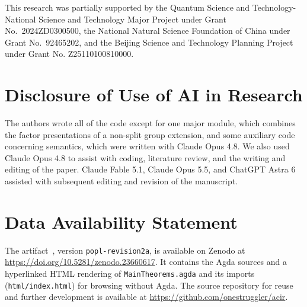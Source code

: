 \documentclass[acmsmall,review]{acmart}
\begin{document}
\begin{acks}
This research was partially supported by the Quantum Science
and Technology-National Science and Technology Major Project under Grant
No.~2024ZD0300500, the National Natural Science Foundation of China
under Grant No.~92465202, and the Beijing Science and Technology Planning Project under Grant No. Z25110100810000.
\end{acks}

\section*{Disclosure of Use of AI in Research}
The authors wrote all of the code except for one major module, which
combines the factor presentations of a non-split group extension, and
some auxiliary code concerning semantics, which were written with Claude
Opus 4.8.  We also used Claude Opus 4.8 to assist with coding,
literature review, and the writing and editing of the paper.
Claude Fable 5.1, Claude Opus 5.5, and ChatGPT Astra 6 assisted with
subsequent editing and revision of the manuscript.

\section*{Data Availability Statement}
The artifact~\cite{qupit-code}, version \texttt{popl-revision2a}, is
available on Zenodo at \url{https://doi.org/10.5281/zenodo.23660617}.
It contains the Agda
sources and a hyperlinked HTML rendering of
\texttt{MainTheorems.agda} and its imports (\texttt{html/index.html}) for
browsing without Agda.
The source repository for reuse and further development is available at
\url{https://github.com/onestruggler/acir}.



\end{document}
